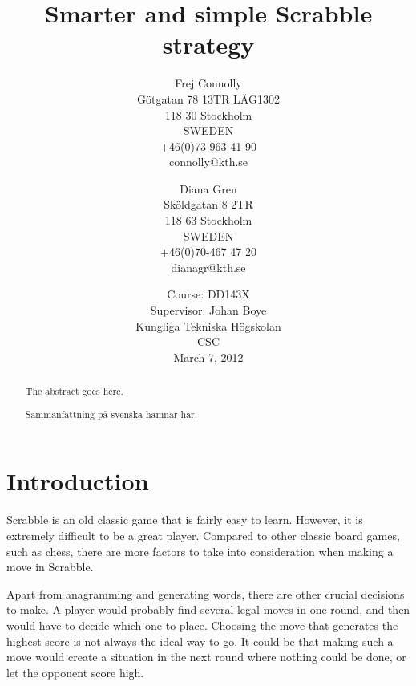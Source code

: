 \documentclass[a4paper, 12pt]{report}
\begin{document}
\graphicspath{{./images/}}
\title{Smarter and simple Scrabble strategy}
\date{Course: DD143X \\ Supervisor: Johan Boye \\ Kungliga Tekniska Högskolan \\ CSC \\ March 7, 2012}
\author{Frej Connolly \\ Götgatan 78 13TR LÄG1302 \\ 118 30 Stockholm \\ SWEDEN \\ +46(0)73-963 41 90 \\ connolly@kth.se \\
        \and Diana Gren \\ Sköldgatan 8 2TR \\ 118 63 Stockholm \\ SWEDEN \\ +46(0)70-467 47 20 \\ dianagr@kth.se}

\maketitle
\begin{abstract}
The abstract goes here.
\end{abstract}

\begin{abstract}
Sammanfattning på svenska hamnar här.
\end{abstract}
\tableofcontents





\chapter{Introduction}
Scrabble is an old classic game that is fairly easy to learn. However, it is extremely difficult to be a great player. Compared to other classic board games, such as chess, there are more factors to take into consideration when making a move in Scrabble. 

Apart from anagramming and generating words, there are other crucial decisions to make. A player would probably find several legal moves in one round, and then would have to decide which one to place. Choosing the move that generates the highest score is not always the ideal way to go. It could be that making such a move would create a situation in the next round where nothing could be done, or let the opponent score high.
\end{document}

